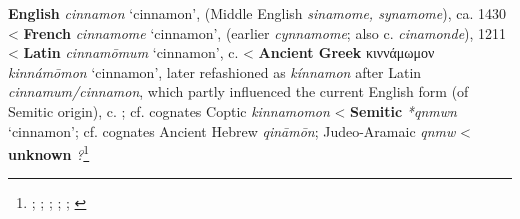 \begin{etymology}\label{ety:cinnamon}
\textbf{English} \textit{cinnamon} `cinnamon', (Middle English \textit{sinamome, synamome}), ca. 1430
< \textbf{French} \textit{cinnamome} `cinnamon', (earlier \textit{cynnamome}; also  c. \textit{cinamonde}), 1211
< \textbf{Latin} \textit{cinnamōmum} `cinnamon',  c. \AD{}
< \textbf{Ancient Greek} {κιννάμωμον} \textit{kinnámōmon} `cinnamon', later refashioned as \textit{kínnamon} after Latin \textit{cinnamum/cinnamon}, which partly influenced the current English form (of Semitic origin),  c. \BC{}; cf. cognates Coptic  \textit{kinnamomon}
< \textbf{Semitic} \textit{*qnmwn} `cinnamon'; cf. cognates Ancient Hebrew  \textit{qināmōn}; Judeo-Aramaic  \textit{qnmw}
< \textbf{unknown} \textit{?}\footnote{\textcite[s.v. cinnamon]{oed}; \textcite{tlfi}; \textcite{lewis_latin_1879}; \textcite[701]{beekes_etymological_2010}; \textcite[585]{klein_comprehensive_1987}; \textcite{rosol_early_2018}}
\end{etymology}